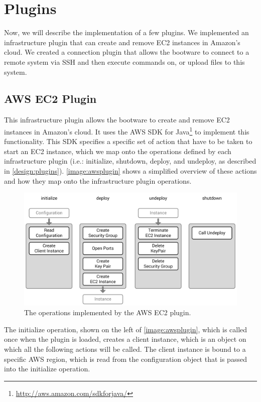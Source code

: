 \section{Plugins}
\label{implementation:plugins}

Now, we will describe the implementation of a few plugins.
We implemented an infrastructure plugin that can create and remove EC2 instances in Amazon's cloud.
We created a connection plugin that allows the bootware to connect to a remote system via SSH and then execute commands on, or upload files to this system.

\subsection{AWS EC2 Plugin}

This infrastructure plugin allows the bootware to create and remove EC2 instances in Amazon's cloud.
It uses the AWS SDK for Java\footnote{\url{http://aws.amazon.com/sdkforjava/}} to implement this functionality.
This SDK specifies a specific set of action that have to be taken to start an EC2 instance, which we map onto the operations defined by each infrastructure plugin (i.e.: initialize, shutdown, deploy, and undeploy, as described in \autoref{design:plugins}).
\autoref{image:awsplugin} shows a simplified overview of these actions and how they map onto the infrastructure plugin operations.

\begin{figure}[!htbp]
	\centering
	\includegraphics[resolution=600]{implementation/assets/aws_plugin}
	\caption{The operations implemented by the AWS EC2 plugin.}
	\label{image:awsplugin}
\end{figure}

The initialize operation, shown on the left of \autoref{image:awsplugin}, which is called once when the plugin is loaded, creates a client instance, which is an object on which all the following actions will be called.
The client instance is bound to a specific AWS region, which is read from the configuration object that is passed into the initialize operation.

